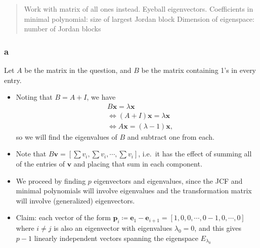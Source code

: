 \begin{solution}

\begin{quote}
Work with matrix of all ones instead. Eyeball eigenvectors. Coefficients
in minimal polynomial: size of largest Jordan block Dimension of
eigenspace: number of Jordan blocks
\end{quote}

\hypertarget{a-111}{%
\subsubsection{a}\label{a-111}}

Let \(A\) be the matrix in the question, and \(B\) be the matrix
containing 1's in every entry.

\begin{itemize}
\item
  Noting that \(B = A+I\), we have
  \begin{align*}
  &B\mathbf{x} = \lambda \mathbf{x} \\
  &\iff (A+I) \mathbf{x} = \lambda \mathbf{x} \\
  &\iff A \mathbf{x} = (\lambda - 1) \mathbf{x}
  ,\end{align*}
  so we will find the eigenvalues of \(B\) and subtract one from each.
\item
  Note that
  \(B\mathbf{v} = {\left[ {\sum v_i, \sum v_i, \cdots, \sum v_i} \right]}\),
  i.e.~it has the effect of summing all of the entries of \(\mathbf{v}\)
  and placing that sum in each component.
\item
  We proceed by finding \(p\) eigenvectors and eigenvalues, since the
  JCF and minimal polynomials will involve eigenvalues and the
  transformation matrix will involve (generalized) eigenvectors.
\item
  Claim: each vector of the form
  \(\mathbf{p}_i \coloneqq\mathbf{e}_1 - \mathbf{e}_{i+1} = {\left[ {1, 0, 0,\cdots, 0 -1, 0, \cdots, 0 } \right]}\)
  where \(i\neq j\) is also an eigenvector with eigenvalues
  \(\lambda_0 = 0\), and this gives \(p-1\) linearly independent vectors
  spanning the eigenspace \(E_{\lambda_0}\)


\end{itemize}
\end{solution}
